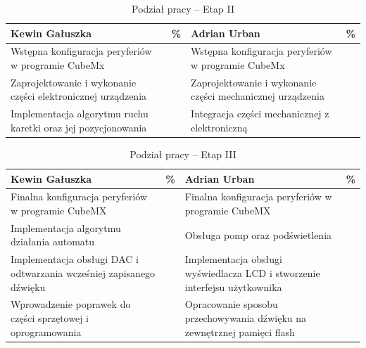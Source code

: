 \documentclass[10pt, a4paper]{article}
\begin{document}
\begin{table}[H]
	\centering
	\begin{tabular}{|L{7cm}|L{0.8cm}||L{7cm}|L{0.8cm}|}
		\hline
		\hline
		\textbf{Kewin Gałuszka} & 
		\% & 
		\textbf{Adrian Urban} & \%\\
		\hline
		\hline
		Wstępna konfiguracja peryferiów w programie CubeMx		& &	
		Wstępna konfiguracja peryferiów w programie CubeMx &\\
		
		\hline
		Zaprojektowanie i wykonanie części elektronicznej urządzenia& &
		Zaprojektowanie i wykonanie części mechanicznej urządzenia  & \\
		\hline
    	Implementacja algorytmu ruchu karetki oraz jej pozycjonowania & &
		Integracja części mechanicznej z elektroniczną &\\
		\hline
	\end{tabular}
	\caption{Podział pracy -- Etap II}
	\label{tab:PodzialPracyEtap2}
\end{table}

\begin{table}[H]
	\centering
	\begin{tabular}{|L{7cm}|L{0.8cm}||L{7cm}|L{0.8cm}|}
		\hline
		\hline
		\textbf{Kewin Gałuszka} & 
		\% & 
		\textbf{Adrian Urban} & \%\\
		\hline
		\hline
		Finalna konfiguracja peryferiów w programie CubeMX		& &	
		Finalna konfiguracja peryferiów w programie CubeMX &\\
		\hline
		Implementacja algorytmu działania automatu & &
		Obsługa pomp oraz podświetlenia &\\
		\hline
		Implementacja obsługi DAC i odtwarzania wcześniej zapisanego dźwięku & &
		Implementacja obsługi wyświedlacza LCD i stworzenie interfejsu użytkownika & \\
		\hline
		Wprowadzenie poprawek do części sprzętowej i oprogramowania & &
		Opracowanie sposobu przechowywania dźwięku na zewnętrznej pamięci flash &\\
		\hline
	\end{tabular}
	\caption{Podział pracy -- Etap III}
	\label{tab:PodzialPracyEtap3}
\end{table}

\end{document}
